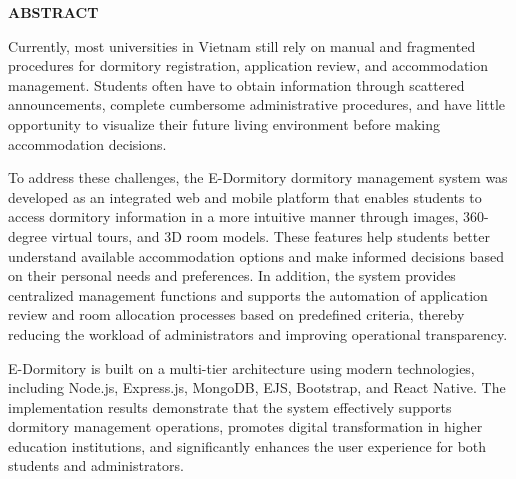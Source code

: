 \documentclass[../DoAn.tex]{subfiles}
\begin{document}
\begin{center}
    {\bfseries\fontsize{18pt}{22pt}\selectfont ABSTRACT}
\end{center}
\vspace{1.5cm}

\noindent\parbox{\linewidth}{%
Currently, most universities in Vietnam still rely on manual and fragmented procedures for dormitory registration, application review, and accommodation management. Students often have to obtain information through scattered announcements, complete cumbersome administrative procedures, and have little opportunity to visualize their future living environment before making accommodation decisions.

To address these challenges, the E-Dormitory dormitory management system was developed as an integrated web and mobile platform that enables students to access dormitory information in a more intuitive manner through images, 360-degree virtual tours, and 3D room models. These features help students better understand available accommodation options and make informed decisions based on their personal needs and preferences. In addition, the system provides centralized management functions and supports the automation of application review and room allocation processes based on predefined criteria, thereby reducing the workload of administrators and improving operational transparency.

E-Dormitory is built on a multi-tier architecture using modern technologies, including Node.js, Express.js, MongoDB, EJS, Bootstrap, and React Native. The implementation results demonstrate that the system effectively supports dormitory management operations, promotes digital transformation in higher education institutions, and significantly enhances the user experience for both students and administrators.%
}
\end{document}
